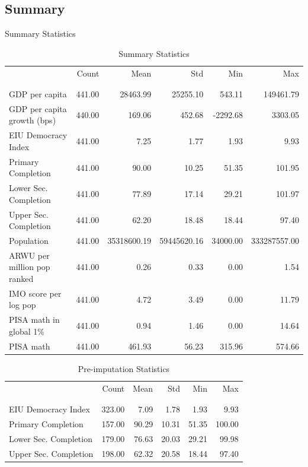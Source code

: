\documentclass[10pt]{beamer}
\begin{document}
\subsection{Summary}
\begin{frame}{Summary Statistics}
    \begin{table}
        \caption{Summary Statistics}
        \resizebox{\linewidth}{!} {
            \begin{tabular}{lrrrrr}
                & Count & Mean & Std & Min & Max \\
                \\[-1.8ex]\hline
                \hline \\[-1.8ex]
               GDP per capita & 441.00 & 28463.99 & 25255.10 & 543.11 & 149461.79 \\
               GDP per capita growth (bps) & 440.00 & 169.06 & 452.68 & -2292.68 & 3303.05 \\
               EIU Democracy Index & 441.00 & 7.25 & 1.77 & 1.93 & 9.93 \\
               Primary Completion & 441.00 & 90.00 & 10.25 & 51.35 & 101.95 \\
               Lower Sec. Completion & 441.00 & 77.89 & 17.14 & 29.21 & 101.97 \\
               Upper Sec. Completion & 441.00 & 62.20 & 18.48 & 18.44 & 97.40 \\
               Population & 441.00 & 35318600.19 & 59445620.16 & 34000.00 & 333287557.00 \\
               ARWU per million pop ranked & 441.00 & 0.26 & 0.33 & 0.00 & 1.54 \\
               IMO score per log pop & 441.00 & 4.72 & 3.49 & 0.00 & 11.79 \\
               PISA math in global 1\% & 441.00 & 0.94 & 1.46 & 0.00 & 14.64 \\
               PISA math & 441.00 & 461.93 & 56.23 & 315.96 & 574.66 \\
               \end{tabular}
        }
    \end{table}
    \begin{table}
        \tiny
        \caption{Pre-imputation Statistics}
        \begin{tabular}{lrrrrr}
         & Count & Mean & Std & Min & Max \\
         \\[-1.8ex]\hline
         \hline \\[-1.8ex]
        EIU Democracy Index & 323.00 & 7.09 & 1.78 & 1.93 & 9.93 \\
        Primary Completion & 157.00 & 90.29 & 10.31 & 51.35 & 100.00 \\
        Lower Sec. Completion & 179.00 & 76.63 & 20.03 & 29.21 & 99.98 \\
        Upper Sec. Completion & 198.00 & 62.32 & 20.58 & 18.44 & 97.40 \\
        \end{tabular}
        \end{table}
\end{frame}
\end{document}
